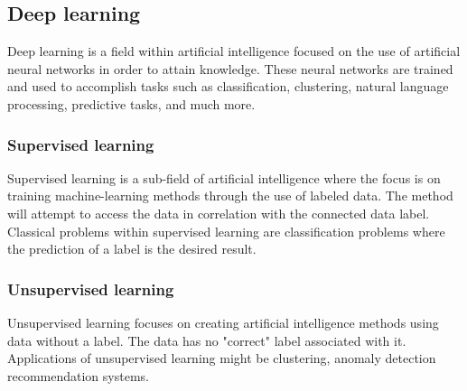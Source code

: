 \subsection{Deep learning}

Deep learning is a field within artificial intelligence focused on the use of artificial neural networks in order to attain knowledge.
These neural networks are trained and used to accomplish tasks such as classification, clustering, natural language processing, predictive tasks, and much more.

\subsubsection{Supervised learning}
Supervised learning is a sub-field of artificial intelligence where the focus is on training
machine-learning methods through the use of labeled data.
The method will attempt to access the data in correlation with the connected data label.
Classical problems within supervised learning are classification problems where the prediction of a label is the desired result.

\subsubsection{Unsupervised learning}
Unsupervised learning focuses on creating artificial intelligence methods using data without a label.
The data has no "correct" label associated with it.
Applications of unsupervised learning might be clustering, anomaly detection recommendation systems.

